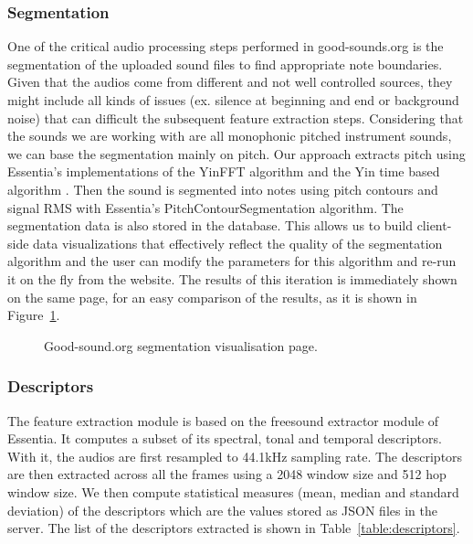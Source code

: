 \documentclass{article}
\begin{document}
\subsubsection{Segmentation}
One of the critical audio processing steps performed in good-sounds.org is the segmentation of the uploaded sound files to find appropriate note boundaries. Given that the audios come from different and not well controlled sources, they might include all kinds of issues (ex. silence at beginning and end or background noise) that can difficult the subsequent feature extraction steps. Considering that the sounds we are working with are all monophonic pitched instrument sounds, we can base the segmentation mainly on pitch. Our approach extracts pitch using Essentia's \cite{03} implementations of the YinFFT algorithm \cite{07} and the Yin time based algorithm \cite{05}. Then the sound is segmented into notes using pitch contours \cite{06} and signal RMS with Essentia’s PitchContourSegmentation algorithm.  
The segmentation data is also stored in the database. This allows us to build client-side data visualizations that effectively reflect the quality of the segmentation algorithm and the user can modify the parameters for this algorithm and re-run it on the fly from the website. The results of this ite\-ration is immediately shown on the same page, for an easy comparison of the results, as it is shown in Figure~\ref{fig:segmentation}.

\begin{figure}[ht]
 \centerline{}
 \caption{Good-sound.org segmentation visualisation page.}
 \label{fig:segmentation}
\end{figure}

\subsubsection{Descriptors}
The feature extraction module is based on the freesound extractor module of Essentia. It computes a subset of its spectral, tonal and temporal descriptors. With it, the audios are first resampled to 44.1kHz sampling rate. The descriptors are then extracted across all the frames using a 2048 window size and 512 hop window size. We then compute statistical measures (mean, median and standard deviation) of the descriptors which are the values stored as JSON files in the server. The list of the descriptors extracted is shown in Table~\ref{table:descriptors}. 
\end{document}
